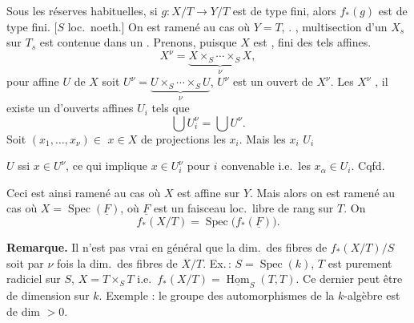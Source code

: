 \documentclass[11pt,a4paper]{article}
\begin{document}

Sous les réserves habituelles, si $g\colon X/T\to Y/T$ est de
type fini, alors $f_{*}(g)$ est de type fini.
[$S$ \struck{\ill{}} loc.\ noeth.] On est ramené au cas où $Y=T$,
 . \struck{\ill{} \ill{} \ill{} \ill{}}
  \ill{} \ill{}
,   multisection d'un
$X_s$ sur  $T_s$ est contenue dans un  .
Prenons, puisque $X$ est ,   fini des tels \ill{}
affines.  
\[
  X^{\nu}=\underbrace{X\times_S\cdots\times_S X}_{\nu},
\]
pour  \ill{} affine
$U$ de $X$ soit
$U^{\nu}=\underbrace{U\times_S\cdots\times_S U}_{\nu}$, $U^{\nu}$ est un
ouvert de $X^{\nu}$.  Les \ill{} \struck{\ill{}} $X^{\nu}$ 
\ill{}
, il existe un   d'ouverts
affines $U_i$ tels que
\[
  \bigcup U_i^{\nu}=\bigcup U^{\nu}.
\]
Soit $(x_1,\dots,x_\nu)\in$ \struck{\ill{} \ill{} \ill{} \ill{} \ill{}}
  $x\in X$ de projections les $x_i$.
Mais les $x_i$   \ill{} \ill{} $U_i$

$U$ ssi $x\in U^{\nu}$, \struck{\ill{}} ce qui implique
$x\in U_i^{\nu}$ pour $i$ convenable i.e.\ les $x_\alpha\in U_i$.
Cqfd.

Ceci est ainsi ramené au cas où $X$
est affine sur $Y$. Mais alors on est
ramené au cas où $X=\operatorname{Spec}(\underline{F})$, où
$\underline{F}$ est un faisceau loc.\ libre de rang \ill{}
sur $T$. On  
\[
  f_{*}(X/T)=\operatorname{Spec}\bigl(f_{*}(\underline{F})\bigr).
\]


\textbf{Remarque.} Il n'est pas vrai en général que
la dim.\ des fibres de $f_{*}(X/T)/S$
soit  par $\nu$ fois la dim.\
des fibres de $X/T$. Ex.\,:
$S=\operatorname{Spec}(k)$, $T$  est purement
radiciel sur $S$, $X=T\times_S T$ i.e.\ $f_{*}(X/T)=
\underline{\operatorname{Hom}}_S(T,T)$. Ce dernier peut être de
dimension  \struck{\ill{}} sur $k$. Exemple : le groupe des
automorphismes de la $k$-algèbre \struck{\ill{}} est
de dim $>0$.
\marginal{\ill{} \ill{} \ill{}}
\end{document}
